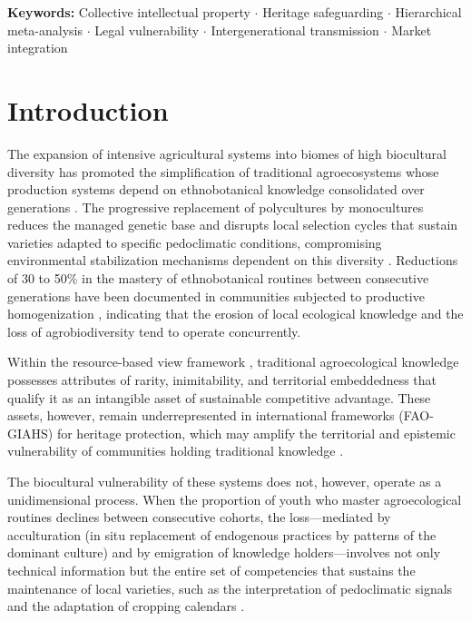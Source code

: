 \documentclass[12pt,a4paper]{article}
\begin{document}
\medskip
\noindent\textbf{Keywords:} Collective intellectual property $\cdot$ Heritage safeguarding $\cdot$ Hierarchical meta-analysis $\cdot$ Legal vulnerability $\cdot$ Intergenerational transmission $\cdot$ Market integration

\linenumbers

\section{Introduction}
\label{sec:intro}

The expansion of intensive agricultural systems into biomes of high biocultural diversity has promoted the simplification of traditional agroecosystems whose production systems depend on ethnobotanical knowledge consolidated over generations \citep{Altieri2004}. The progressive replacement of polycultures by monocultures reduces the managed genetic base and disrupts local selection cycles that sustain varieties adapted to specific pedoclimatic conditions, compromising environmental stabilization mechanisms dependent on this diversity \citep{Jarvis2008}. Reductions of 30 to 50\% in the mastery of ethnobotanical routines between consecutive generations have been documented in communities subjected to productive homogenization \citep{ReyesGarcia2013}, indicating that the erosion of local ecological knowledge and the loss of agrobiodiversity tend to operate concurrently.

Within the resource-based view framework \citep{Barney1991}, traditional agroecological knowledge possesses attributes of rarity, inimitability, and territorial embeddedness that qualify it as an intangible asset of sustainable competitive advantage. These assets, however, remain underrepresented in international frameworks (FAO-GIAHS) for heritage protection, which may amplify the territorial and epistemic vulnerability of communities holding traditional knowledge \citep{Santilli2009,Cunha2009,Goncalves2022}.

The biocultural vulnerability of these systems does not, however, operate as a unidimensional process. When the proportion of youth who master agroecological routines declines between consecutive cohorts, the loss---mediated by acculturation (in situ replacement of endogenous practices by patterns of the dominant culture) and by emigration of knowledge holders---involves not only technical information but the entire set of competencies that sustains the maintenance of local varieties, such as the interpretation of pedoclimatic signals and the adaptation of cropping calendars \citep{GomezBaggethun2013}.
\end{document}

